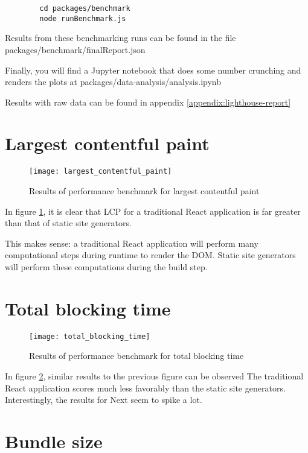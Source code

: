 \begin{verbatim}
		cd packages/benchmark
		node runBenchmark.js
\end{verbatim}

Results from these benchmarking runs can be found in the file packages/benchmark/finalReport.json

Finally, you will find a Jupyter notebook that does some number crunching and renders the plots at packages/data-analysis/analysis.ipynb

Results with raw data can be found in appendix \ref{appendix:lighthouse-report}

\section{Largest contentful paint}

\begin{figure}[htb!]
	\texttt{[image: largest\_contentful\_paint]}{}
	\caption{Results of performance benchmark for largest contentful paint}
	\label{fig:largest_contentful_paint}
\end{figure}

In figure \ref{fig:largest_contentful_paint}, it is clear that LCP for a traditional React application is far greater than that of static site generators.

This makes sense: a traditional React application will perform many computational steps during runtime to render the DOM.
Static site generators will perform these computations during the build step.

\section{Total blocking time}


\begin{figure}[htb!]
	\texttt{[image: total\_blocking\_time]}
	\caption{Results of performance benchmark for total blocking time}
	\label{fig:total_blocking_time}
\end{figure}

In figure \ref{fig:total_blocking_time}, similar results to the previous figure can be observed
The traditional React application scores much less favorably than the static site generators.
Interestingly, the results for Next seem to spike a lot.

\section{Bundle size}

